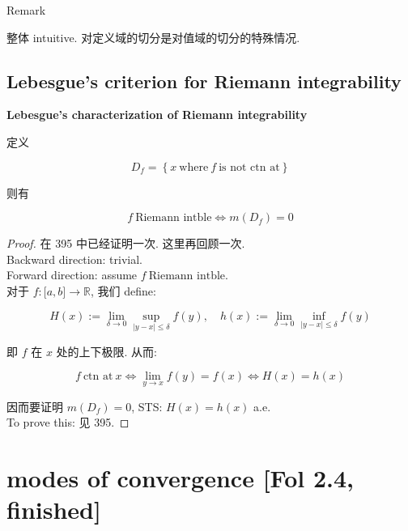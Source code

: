 \documentclass{qlnotes-export}
\begin{document}
\begin{qlremark}{Remark}

整体 intuitive. 对定义域的切分是对值域的切分的特殊情况.

\end{qlremark}

\subsection{Lebesgue's criterion for Riemann integrability}\label{lebesgues-criterion-for-riemann-integrability}

\begin{theorem}{\protect{}\label{kn-lebesgue-s-characterization-of-riemann-integrability}{\textbf{Lebesgue's
characterization of Riemann integrability}}}

定义

\[D_{f} = \left\{ {x\ \text{where}\ f\ \text{is not ctn at}} \right\}\]

则有

\[f\ \text{Riemann intble}\Leftrightarrow m(D_{f}) = 0\]

\end{theorem}

\begin{proof}

在 395 中已经证明一次. 这里再回顾一次.\\
Backward direction: trivial.\\
Forward direction: assume \(f\ \text{Riemann intble}\).\\
对于 \(f:\lbrack a,b\rbrack\rightarrow{\mathbb{R}}\), 我们 define:

\[H(x) := \lim\limits_{\delta\rightarrow 0}\sup\limits_{|y - x| \leq \delta}f(y),\quad h(x) := \lim\limits_{\delta\rightarrow 0}\inf\limits_{|y - x| \leq \delta}f(y)\]

即 \(f\) 在 \(x\) 处的上下极限. 从而:

\[f\ \text{ctn at}\ x\Leftrightarrow\lim\limits_{y\rightarrow x}f(y) = f(x)\Leftrightarrow H(x) = h(x)\]

因而要证明 \(m(D_{f}) = 0\), STS: \(H(x) = h(x)\) a.e.\\
To prove this: 见 395.

\end{proof}

\section{modes of convergence {[}Fol 2.4, finished{]}}
\end{document}
